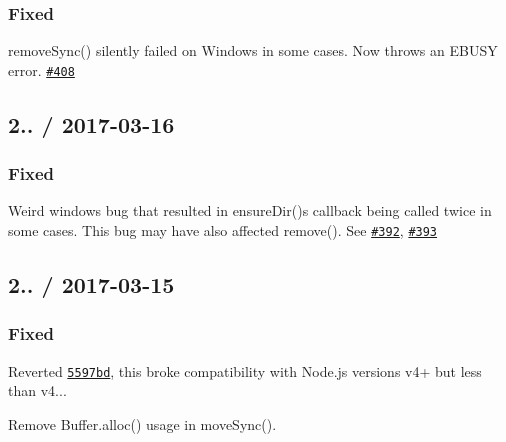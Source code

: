 \subsubsection*{Fixed}


\begin{DoxyItemize}
\item {\ttfamily remove\+Sync()} silently failed on Windows in some cases. Now throws an {\ttfamily E\+B\+U\+SY} error. \href{https://github.com/jprichardson/node-fs-extra/pull/408}{\tt \#408}
\end{DoxyItemize}

\subsection*{2.. / 2017-\/03-\/16 }

\subsubsection*{Fixed}


\begin{DoxyItemize}
\item Weird windows bug that resulted in {\ttfamily ensure\+Dir()}\textquotesingle{}s callback being called twice in some cases. This bug may have also affected {\ttfamily remove()}. See \href{https://github.com/jprichardson/node-fs-extra/issues/392}{\tt \#392}, \href{https://github.com/jprichardson/node-fs-extra/pull/393}{\tt \#393}
\end{DoxyItemize}

\subsection*{2.. / 2017-\/03-\/15 }

\subsubsection*{Fixed}


\begin{DoxyItemize}
\item Reverted \href{https://github.com/jprichardson/node-fs-extra/commit/5597bd5b67f7d060f5f5bf26e9635be48330f5d7}{\tt {\ttfamily 5597bd}}, this broke compatibility with Node.\+js versions v4+ but less than {\ttfamily v4..}.
\item Remove {\ttfamily Buffer.\+alloc()} usage in {\ttfamily move\+Sync()}.
\end{DoxyItemize}

